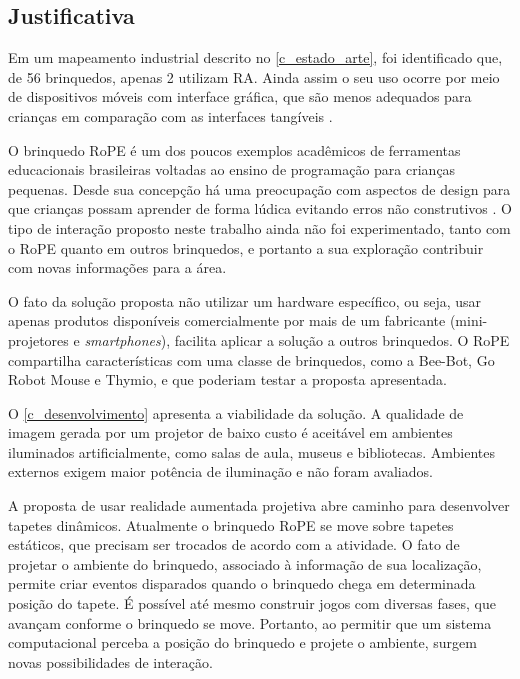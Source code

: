 \subsection{Justificativa}
\label{ss_cintro_justificativa}

Em um mapeamento industrial descrito no \autoref{c_estado_arte}, foi identificado que, de 56 brinquedos, apenas 2 utilizam RA. Ainda assim o seu uso ocorre por meio de dispositivos móveis com interface gráfica, que são menos adequados para crianças em comparação com as interfaces tangíveis \cite{sapounidis_tangible_2019, zuckerman_tui_2013}.


O brinquedo RoPE é um dos poucos exemplos acadêmicos de ferramentas educacionais brasileiras voltadas ao ensino de programação para crianças pequenas. Desde sua concepção há uma preocupação com aspectos de design para que crianças possam aprender de forma lúdica evitando erros não construtivos \cite{raabe_brinquedos_2015}. O tipo de interação proposto neste trabalho ainda não foi experimentado, tanto com o RoPE quanto em outros brinquedos, e portanto a sua exploração contribuir com novas informações para a área.

O fato da solução proposta não utilizar um hardware específico, ou seja, usar apenas produtos disponíveis comercialmente por mais de um fabricante (mini-projetores e \textit{smartphones}), facilita aplicar a solução a outros brinquedos. O RoPE compartilha características com uma classe de brinquedos, como a Bee-Bot, Go Robot Mouse e Thymio, e que poderiam testar a proposta apresentada.

O \autoref{c_desenvolvimento} apresenta a viabilidade da solução. A qualidade de imagem gerada por um projetor de baixo custo é aceitável em ambientes iluminados artificialmente, como salas de aula, museus e bibliotecas. Ambientes externos exigem maior potência de iluminação e não foram avaliados.

A proposta de usar realidade aumentada projetiva abre caminho para desenvolver tapetes dinâmicos. Atualmente o brinquedo RoPE se move sobre tapetes estáticos, que precisam ser trocados de acordo com a atividade. O fato de projetar o ambiente do brinquedo, associado à informação de sua localização, permite criar eventos disparados quando o brinquedo chega em determinada posição do tapete. É possível até mesmo construir jogos com diversas fases, que avançam conforme o brinquedo se move. Portanto, ao permitir que um sistema computacional perceba a posição do brinquedo e projete o ambiente, surgem novas possibilidades de interação.

